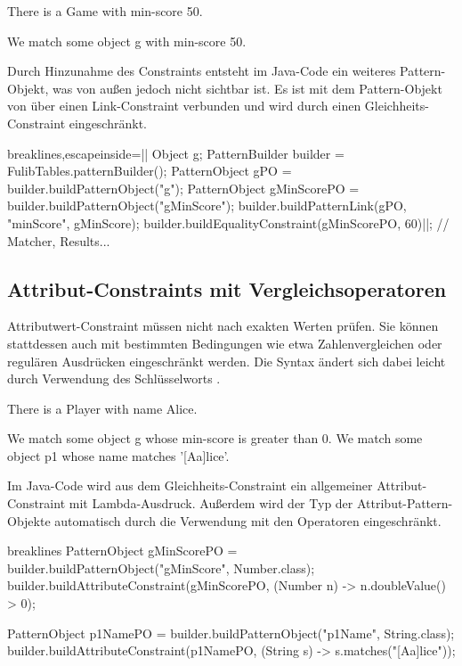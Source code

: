 \begin{mdcodeblock}
    There is a Game with min-score 50.

    We match some object g with min-score 50.
\end{mdcodeblock}

Durch Hinzunahme des Constraints entsteht im Java-Code ein weiteres Pattern-Objekt, was von außen jedoch nicht sichtbar ist.
Es ist mit dem Pattern-Objekt von  über einen Link-Constraint verbunden und wird durch einen Gleichheits-Constraint eingeschränkt.

\begin{jcodeblock*}{breaklines,escapeinside=||}
    Object g;
    {
        PatternBuilder builder = FulibTables.patternBuilder();
        PatternObject gPO = builder.buildPatternObject("g");
        PatternObject gMinScorePO = builder.buildPatternObject("gMinScore");
        builder.buildPatternLink(gPO, "minScore", gMinScore);
        builder.buildEqualityConstraint(gMinScorePO, 60)|\footnotemark|;
        // Matcher, Results...
    }
\end{jcodeblock*}

\subsection{Attribut-Constraints mit Vergleichsoperatoren}

Attributwert-Constraint müssen nicht nach exakten Werten prüfen.
Sie können stattdessen auch mit bestimmten Bedingungen wie etwa Zahlenvergleichen oder regulären Ausdrücken eingeschränkt werden.
Die Syntax ändert sich dabei leicht durch Verwendung des Schlüsselworts .

\begin{mdcodeblock}
    There is a Player with name Alice.

    We match some object g whose min-score is greater than 0.
    We match some object p1 whose name matches '[Aa]lice'.
\end{mdcodeblock}

Im Java-Code wird aus dem Gleichheits-Constraint ein allgemeiner Attribut-Constraint mit Lambda-Ausdruck.
Außerdem wird der Typ der Attribut-Pattern-Objekte automatisch durch die Verwendung mit den Operatoren eingeschränkt.

\begin{jcodeblock*}{breaklines}
    PatternObject gMinScorePO = builder.buildPatternObject("gMinScore", Number.class);
    builder.buildAttributeConstraint(gMinScorePO, (Number n) -> n.doubleValue() > 0);

    PatternObject p1NamePO = builder.buildPatternObject("p1Name", String.class);
    builder.buildAttributeConstraint(p1NamePO, (String s) -> s.matches("[Aa]lice"));
\end{jcodeblock*}

